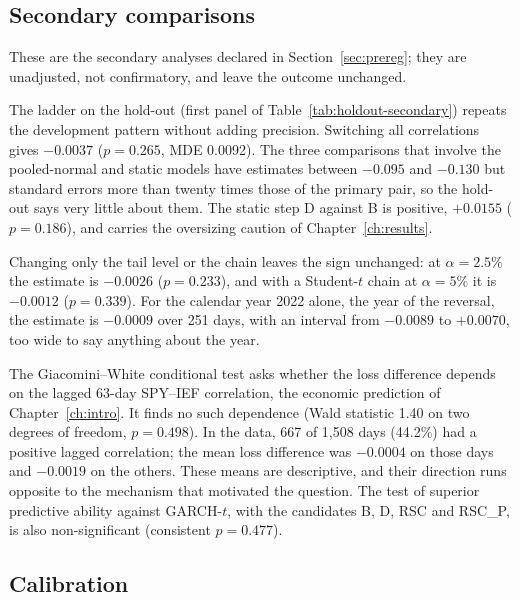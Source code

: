 \subsection{Secondary comparisons}\label{sec:holdout-secondary}

These are the secondary analyses declared in Section~\ref{sec:prereg}; they are unadjusted, not confirmatory, and leave the outcome unchanged.



The ladder on the hold-out (first panel of Table~\ref{tab:holdout-secondary}) repeats the development pattern without adding precision. Switching all correlations gives $-0.0037$ ($p=0.265$, MDE 0.0092). The three comparisons that involve the pooled-normal and static models have estimates between $-0.095$ and $-0.130$ but standard errors more than twenty times those of the primary pair, so the hold-out says very little about them. The static step D against B is positive, $+0.0155$ ($p=0.186$), and carries the oversizing caution of Chapter~\ref{ch:results}.

Changing only the tail level or the chain leaves the sign unchanged: at $\alpha=2.5\%$ the estimate is $-0.0026$ ($p=0.233$), and with a Student-$t$ chain at $\alpha=5\%$ it is $-0.0012$ ($p=0.339$). For the calendar year 2022 alone, the year of the reversal, the estimate is $-0.0009$ over 251 days, with an interval from $-0.0089$ to $+0.0070$, too wide to say anything about the year.

The Giacomini--White conditional test asks whether the loss difference depends on the lagged 63-day SPY--IEF correlation, the economic prediction of Chapter~\ref{ch:intro}. It finds no such dependence (Wald statistic 1.40 on two degrees of freedom, $p=0.498$). In the data, 667 of 1,508 days (44.2\%) had a positive lagged correlation; the mean loss difference was $-0.0004$ on those days and $-0.0019$ on the others. These means are descriptive, and their direction runs opposite to the mechanism that motivated the question. The test of superior predictive ability against GARCH-$t$, with the candidates B, D, RSC and RSC\_P, is also non-significant (consistent $p=0.477$).

\subsection{Calibration}\label{sec:holdout-calibration}



